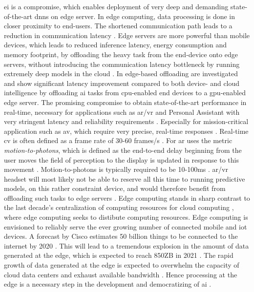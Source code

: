 \gls{ei} is a compromise, which enables deployment of very deep and demanding state-of-the-art \gls{dnn}s on edge server. In edge computing, data processing is done in closer proximity to end-users. The shortened communication path leads to a reduction in communication latency \cite{shi_edge_2016}. Edge servers are more powerful than mobile devices, which leads to reduced inference latency, energy consumption and memory footprint, by offloading the heavy task from the end-device onto edge servers, without introducing the communication latency bottleneck by running extremely deep models in the cloud \cite{zhou_edge_2019}. In \cite{karlsen_prototyping_nodate} edge-based offloading are investigated and show significant latency improvement compared to both device- and cloud intelligence by offloading \gls{ai} tasks from \gls{cpu}-enabled end devices to a \gls{gpu}-enabled edge server. The promising compromise to obtain state-of-the-art performance in real-time, necessary for applications such as \gls{ar}/\gls{vr} and Personal Assistant with very stringent latency and reliability requirements \cite{zhou_edge_2019}. Especially for mission-critical application such as \gls{av}, which require very precise, real-time responses \cite{stoica_berkeley_2017}. Real-time \gls{cv} is often defined as a frame rate of 30-60 frames/s \cite{chen_deep_2019}. For \gls{ar} uses the metric \emph{motion-to-photons}, which is defined as the end-to-end delay beginning from the user moves the field of perception to the display is updated in response to this movement \cite{lavalle_virtual_2019}. Motion-to-photons is typically required to be 10-100ms \cite{chen_deep_2019}. \gls{ar}/\gls{vr} headset will most likely not be able to reserve all this time to running predictive models, on this rather constraint device, and would therefore benefit from offloading such tasks to edge servers \cite{chen_deep_2019}. Edge computing stands in sharp contrast to the last decade's centralization of computing resources for cloud computing \cite{shi_edge_2016}, where edge computing seeks to distibute computing resources. Edge computing is envisioned to reliably serve the ever growing number of connected mobile and \gls{iot} devices. A forecast by Cisco estimates 50 billion things to be connected to the internet by 2020 \cite{evans_internet_2011}. This will lead to a tremendous explosion in the amount of data generated at the edge, which is expected to reach 850ZB in 2021 \cite{cisco_cisco_2018}. The rapid growth of data generated at the edge is expected to overwhelm the capacity of cloud data centers and exhaust available bandwidth . Hence processing at the edge is a necessary step in the development and democratizing of \gls{ai} \cite{zhou_edge_2019}.


